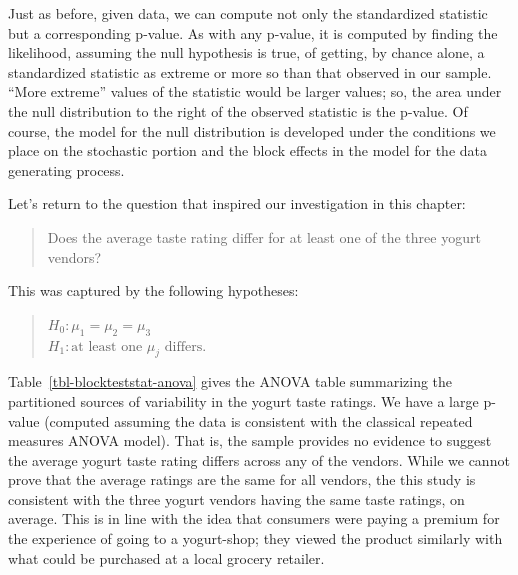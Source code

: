 \documentclass[
  letterpaper,
  DIV=11,
  numbers=noendperiod]{scrreprt}
\theoremstyle{definition}
\theoremstyle{definition}
\theoremstyle{plain}
\theoremstyle{remark}
\begin{document}
Just as before, given data, we can compute not only the standardized
statistic but a corresponding p-value. As with any p-value, it is
computed by finding the likelihood, assuming the null hypothesis is
true, of getting, by chance alone, a standardized statistic as extreme
or more so than that observed in our sample. ``More extreme'' values of
the statistic would be larger values; so, the area under the null
distribution to the right of the observed statistic is the p-value. Of
course, the model for the null distribution is developed under the
conditions we place on the stochastic portion and the block effects in
the model for the data generating process.

Let's return to the question that inspired our investigation in this
chapter:

\begin{quote}
Does the average taste rating differ for at least one of the three
yogurt vendors?
\end{quote}

This was captured by the following hypotheses:

\begin{quote}
\(H_0: \mu_1 = \mu_2 = \mu_3\)\\
\(H_1: \text{at least one } \mu_j \text{ differs}.\)
\end{quote}

Table~\ref{tbl-blockteststat-anova} gives the ANOVA table summarizing
the partitioned sources of variability in the yogurt taste ratings. We
have a large p-value (computed assuming the data is consistent with the
classical repeated measures ANOVA model). That is, the sample provides
no evidence to suggest the average yogurt taste rating differs across
any of the vendors. While we cannot prove that the average ratings are
the same for all vendors, the this study is consistent with the three
yogurt vendors having the same taste ratings, on average. This is in
line with the idea that consumers were paying a premium for the
experience of going to a yogurt-shop; they viewed the product similarly
with what could be purchased at a local grocery retailer.

\begin{table}

\caption{\label{tbl-blockteststat-anova}Analysis of the sources of
variability in the yogurt taste scores as a function of the vendors
while accounting for the repeated measures on the participants.}


\end{table}%
\end{document}
